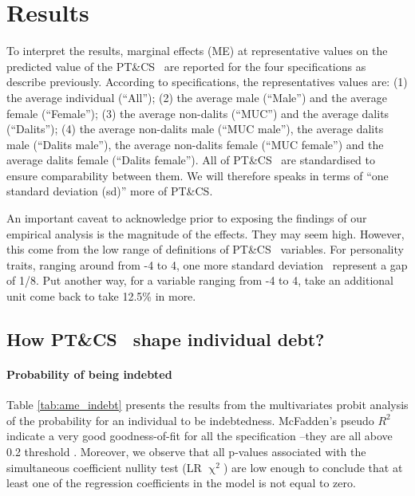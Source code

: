 \documentclass[a4paper, 11pt, onecolumn]{article}
\newcommand{\sd}{standard deviation}
\newcommand{\cl}{confidence level}
\newcommand{\PTCS}{PT\&CS}
\begin{document}






\section{Results}
\label{section:results}

To interpret the results, marginal effects (ME) at representative values on the predicted value of the \PTCS~ are reported for the four specifications as describe previously.
According to specifications, the representatives values are: (1) the average individual (``All''); (2) the average male (``Male'') and the average female (``Female''); (3) the average non-dalits (``MUC'') and the average dalits (``Dalits''); (4) the average non-dalits male (``MUC male''), the average dalits male (``Dalits male''), the average non-dalits female (``MUC female'') and the average dalits female (``Dalits female'').
All of \PTCS~ are standardised to ensure comparability between them.
We will therefore speaks in terms of ``one standard deviation (sd)'' more of \PTCS.

An important caveat to acknowledge prior to exposing the findings of our empirical analysis is the magnitude of the effects.
They may seem high. 
However, this come from the low range of definitions of \PTCS~ variables.
For personality traits, ranging around from -4 to 4, one more \sd~ represent a gap of 1/8.
Put another way, for a variable ranging from -4 to 4, take an additional unit come back to take 12.5\% in more.


	\subsection{How \PTCS~ shape individual debt?}

\paragraph{Probability of being indebted}
Table \ref{tab:ame_indebt} presents the results from the multivariates probit analysis of the probability for an individual to be indebtedness.
McFadden's pseudo $R^2$ indicate a very good goodness-of-fit for all the specification --they are all above 0.2 threshold \citep{McFadden1979}.
Moreover, we observe that all p-values associated with the simultaneous coefficient nullity test (LR $\upchi^2$) are low enough to conclude that at least one of the regression coefficients in the model is not equal to zero.
\end{document}
